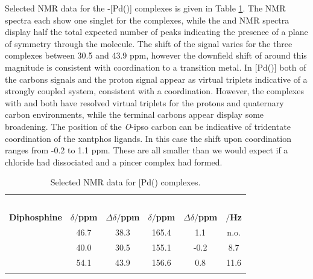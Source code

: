 Selected NMR data for the \trans-[Pd(\tBuxantphos)] complexes is given in Table \ref{table:PdClNMR}.  The \phosphorus{} NMR spectra each show one singlet for the complexes, while the \proton{} and \carbon{} NMR spectra display half the total expected number of peaks indicating the presence of a plane of symmetry through the molecule.  The shift of the \phosphorus{} signal varies for the three complexes between 30.5 and 43.9 ppm, however the downfield shift of around this magnitude is consistent with coordination to a transition metal.  In [Pd(\tBuxantphos)] both of the \tBu{} carbons signals and the proton signal appear as virtual triplets indicative of a strongly coupled system, consistent with a \trans{} coordination.  However, the complexes with \tBusixantphos{} and \tButhixantphos{} both have resolved virtual triplets for the \tBu{} protons and quaternary carbon environments, while the terminal carbons appear display some broadening.  The position of the \emph{O}-ipso carbon can be indicative of tridentate coordination of the xantphos ligands.  In this case the shift upon coordination ranges from -0.2 to 1.1 ppm.  These are all smaller than we would expect if a chloride had dissociated and a pincer complex had formed.  

\begin{table}[htbp]
\caption[Selected NMR data for [Pd(\tBuxantphos)\ce{Cl2}{]} complexes]{Selected NMR data for [Pd(\tBuxantphos)\ce{Cl2}{]} complexes.}
\label{table:PdClNMR}
\small
\begin{center}
\begin{tabular}{l c c c c c}
	\toprule{}
	~~ & \multicolumn{2}{c}{\bfseries{\phosphorus}} & \multicolumn{3}{c}{\bfseries{\carbon}}\\
	\cmidrule(lr){2-3} \cmidrule(lr){4-6}
	\bfseries{Diphosphine}&\bfseries{$\delta/$ppm}&\bfseries{$\Delta\delta/$ppm}& \bfseries{$\delta/$ppm} & \bfseries{$\Delta\delta/$ppm}&\bfseries{\J{}$/$Hz}\\
	\midrule{}
	~\tBuSixantphos 	& 46.7	& 38.3	& 165.4	& 1.1 	& n.o. \\
	~\tBuThixantphos	& 40.0	& 30.5	& 155.1	& -0.2 	& 8.7 \\
	~\tBuXantphos		& 54.1	& 43.9	& 156.6	& 0.8		& 11.6 \\
	\bottomrule{}
\end{tabular}
\end{center}
\end{table}

